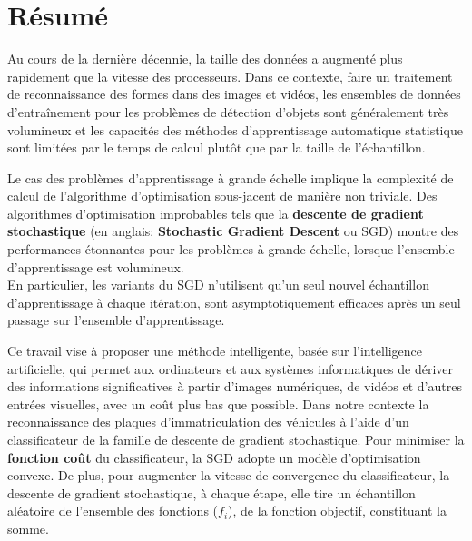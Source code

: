 
\renewcommand{\abstractname}{Résumé} %


\begingroup
\let\clearpage\relax
\let\cleardoublepage\relax
\let\cleardoublepage\relax

\chapter*{Résumé}
	Au cours de la dernière décennie, la taille des données a augmenté plus rapidement que la vitesse des processeurs. Dans ce contexte, faire un traitement de {reconnaissance} des formes dans des images et vidéos, les ensembles de données d'entraînement pour les problèmes de détection d'objets sont généralement très volumineux et les capacités des méthodes d'apprentissage automatique statistique sont limitées par le temps de calcul plutôt que par la taille de l'échantillon. 
	
	Le cas des problèmes d'apprentissage à grande échelle implique la complexité de calcul de l'algorithme d'optimisation sous-jacent de manière non triviale. Des algorithmes d'optimisation improbables tels que la \textbf{descente de gradient stochastique} (en anglais: \textbf{Stochastic Gradient Descent} ou SGD) montre des performances étonnantes pour les problèmes à grande échelle, lorsque l'ensemble d'apprentissage est volumineux. \\
	En particulier, les variants du SGD n'utilisent qu'un seul nouvel échantillon d'apprentissage à chaque itération, sont asymptotiquement efficaces après un seul passage sur l'ensemble d'apprentissage.	
	
	Ce travail vise à proposer une méthode  intelligente, basée sur l'intelligence artificielle, qui permet aux ordinateurs et aux systèmes informatiques de dériver des informations significatives à partir d'images numériques, de vidéos et d'autres entrées visuelles, avec un coût plus bas que possible. Dans notre contexte la reconnaissance des plaques d’immatriculation des véhicules à l'aide d’un classificateur de la famille de descente de gradient stochastique. Pour minimiser la \textbf{fonction coût} du classificateur, la SGD adopte un modèle d'optimisation convexe. De plus, pour augmenter la vitesse de convergence du classificateur, la descente de gradient stochastique, à chaque étape, elle tire un échantillon aléatoire de l'ensemble des fonctions ($f_i$), de la fonction objectif, constituant la somme.
	 
